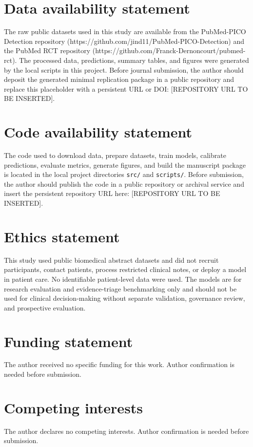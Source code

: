 \section*{Data availability statement}
The raw public datasets used in this study are available from the PubMed-PICO Detection repository (https://github.com/jind11/PubMed-PICO-Detection) and the PubMed RCT repository (https://github.com/Franck-Dernoncourt/pubmed-rct). The processed data, predictions, summary tables, and figures were generated by the local scripts in this project. Before journal submission, the author should deposit the generated minimal replication package in a public repository and replace this placeholder with a persistent URL or DOI: [REPOSITORY URL TO BE INSERTED].

\section*{Code availability statement}
The code used to download data, prepare datasets, train models, calibrate predictions, evaluate metrics, generate figures, and build the manuscript package is located in the local project directories \texttt{src/} and \texttt{scripts/}. Before submission, the author should publish the code in a public repository or archival service and insert the persistent repository URL here: [REPOSITORY URL TO BE INSERTED].

\section*{Ethics statement}
This study used public biomedical abstract datasets and did not recruit participants, contact patients, process restricted clinical notes, or deploy a model in patient care. No identifiable patient-level data were used. The models are for research evaluation and evidence-triage benchmarking only and should not be used for clinical decision-making without separate validation, governance review, and prospective evaluation.

\section*{Funding statement}
The author received no specific funding for this work. Author confirmation is needed before submission.

\section*{Competing interests}
The author declares no competing interests. Author confirmation is needed before submission.

